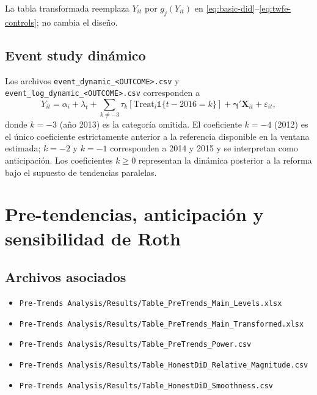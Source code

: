 \documentclass[11pt]{article}
\newcommand{\Treat}{\mathrm{Treat}}
\newcommand{\ind}{\mathbb{1}}
\newcommand{\file}[1]{\texttt{#1}}
\begin{document}
La tabla transformada reemplaza $Y_{it}$ por $g_j(Y_{it})$ en
\eqref{eq:basic-did}--\eqref{eq:twfe-controls}; no cambia el diseño.

\subsection{Event study dinámico}

Los archivos \file{event\_dynamic\_<OUTCOME>.csv} y
\file{event\_log\_dynamic\_<OUTCOME>.csv} corresponden a
\begin{equation}
 Y_{it}=\alpha_i+\lambda_t+
 \sum_{k\neq -3}\tau_k
 \left[\Treat_i\ind\{t-2016=k\}\right]
 +\boldsymbol\gamma'\mathbf X_{it}+\varepsilon_{it},
 \label{eq:event-study}
\end{equation}
donde $k=-3$ (año 2013) es la categoría omitida. El coeficiente $k=-4$ (2012)
es el único coeficiente estrictamente anterior a la referencia disponible en la
ventana estimada; $k=-2$ y $k=-1$ corresponden a 2014 y 2015 y se interpretan
como anticipación. Los coeficientes $k\geq 0$ representan la dinámica posterior
a la reforma bajo el supuesto de tendencias paralelas.

\section{Pre-tendencias, anticipación y sensibilidad de Roth}

\subsection*{Archivos asociados}
\begin{itemize}
 \item \file{Pre-Trends Analysis/Results/Table\_PreTrends\_Main\_Levels.xlsx}
 \item \file{Pre-Trends Analysis/Results/Table\_PreTrends\_Main\_Transformed.xlsx}
 \item \file{Pre-Trends Analysis/Results/Table\_PreTrends\_Power.csv}
 \item \file{Pre-Trends Analysis/Results/Table\_HonestDiD\_Relative\_Magnitude.csv}
 \item \file{Pre-Trends Analysis/Results/Table\_HonestDiD\_Smoothness.csv}
\end{itemize}
\end{document}
